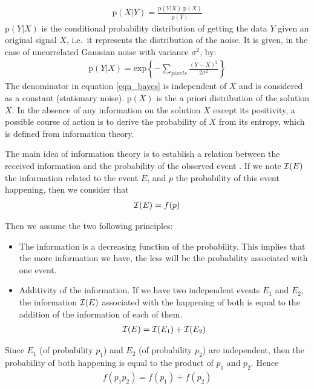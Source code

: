 \begin{eqnarray}
 \mathrm{p}(X|Y) = \frac{\mathrm{p}(Y|X).\mathrm{p}(X)}{\mathrm{p}(Y)}
\label{eqn_bayes}
\end{eqnarray}
$\mathrm{p}(Y|X)$ is the conditional probability distribution of getting the data 
$Y$ given an original signal $X$, i.e.\ it represents the distribution 
of the noise. It is given, in the case of uncorrelated Gaussian 
noise with variance $\sigma^2$, by:
\begin{eqnarray}
 \mathrm{p}(Y|X) = \mathrm{exp} \left\{
-\sum_{pixels} \frac{ (Y-X)^2}{2{\sigma}^2} \right\}
\label{eqn_proba}
\end{eqnarray}
The denominator in  equation \ref{eqn_bayes} is independent of $X$ and
 is considered as a constant (stationary noise). 
$\mathrm{p}(X)$ is the a priori distribution 
of the solution $X$. In the absence of any information on the solution 
$X$ except its positivity, a possible course of action 
is to derive the probability
of $X$ from its entropy, which is defined from information theory.

The main idea of information theory \cite{ima:shannon48} is to establish
a relation between the received information and the probability of
the observed event \cite{ima:bijaoui84}. If we note ${\cal I}(E)$ the information
related to the event $E$, and $p$ the probability of this
event happening, then we consider that
\begin{eqnarray}
{\cal I}(E) = f(p)
\end{eqnarray}

Then we assume the two following principles:
\begin{itemize}
\item The information is a decreasing function of the probability. This 
implies that the more information we have, the  less will be the probability 
associated with one event.
\item Additivity of the information. If we have two independent events 
$E_1$ and $E_2$, the information ${\cal I}(E)$ associated with the happening
of both is equal
to the addition of the information of each of them.
\begin{eqnarray}
{\cal I}(E) = {\cal I}(E_1) + {\cal I}(E_2)
\end{eqnarray}
\end{itemize}

Since $E_1$ (of probability $p_1$) and $E_2$ (of probability $p_2$) are 
independent, then the probability of both happening is equal to the
product of $p_1$ and $p_2$.  Hence
\begin{eqnarray}
f(p_1 p_2) = f(p_1) + f(p_2) 
\end{eqnarray}

